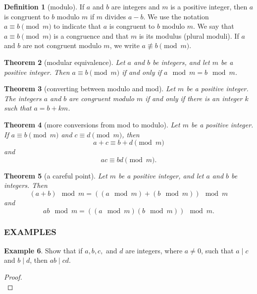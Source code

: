 \documentclass[letterpaper,10pt]{article}
\theoremstyle{plain}
\newtheorem{thm}{Theorem}[section]
\theoremstyle{definition}
\newtheorem{defn}[thm]{Definition}
\newtheorem{exmp}[thm]{Example}
\theoremstyle{remark}
\begin{document}
\begin{defn}[modulo]
If \(a\) and \(b\) are integers and \(m\) is a positive integer, then \(a\) is congruent to \(b\) modulo \(m\) if \(m\) divides \(a - b\). We use the notation \(a \equiv b \pmod{m}\) to indicate that \(a\) is congruent to \(b\) modulo \(m\). We say that \(a \equiv b \pmod{m}\) is a congruence and that \(m\) is its modulus (plural moduli). If \(a\) and \(b\) are not congruent modulo \(m\), we write \(a \not\equiv b \pmod{m}\).


\end{defn}
\begin{thm}[modular equivalence]
Let \(a\) and \(b\) be integers, and let \(m\) be a positive integer. Then \(a \equiv b \pmod{m}\) if and only if \(a \mod m = b \mod m\).

\end{thm}
\begin{thm}[converting between modulo and mod]
Let \(m\) be a positive integer. The integers \(a\) and \(b\) are congruent modulo \(m\) if and only if there is an integer \(k\) such that \(a = b + km\).


\end{thm}
\begin{thm}[more conversions from mod to modulo]
Let \(m\) be a positive integer. If \(a \equiv b \pmod{m}\) and \(c \equiv d \pmod{m}\), then
\[a + c \equiv b + d \pmod{m}\] and \[ac \equiv bd \pmod{m}.\]

\end{thm}
\begin{thm}[a careful point]
Let \(m\) be a positive integer, and let \(a\) and \(b\) be integers. Then
\[(a + b) \mod m = ((a \mod m) + (b \mod m)) \mod m\]
and
\[ab \mod m = ((a \mod m)(b \mod m)) \mod m.\]

\end{thm}
\newpage
\subsubsection{EXAMPLES}
\begin{exmp}
Show that if \(a, b, c, \) and \(d\) are integers, where \(a \neq 0\), such that \(a \mid c\) and \(b \mid d\), then \(ab \mid cd\).
\begin{proof}$ $\\

\vspace{2cm}
\end{proof}
\end{exmp}
\end{document}

